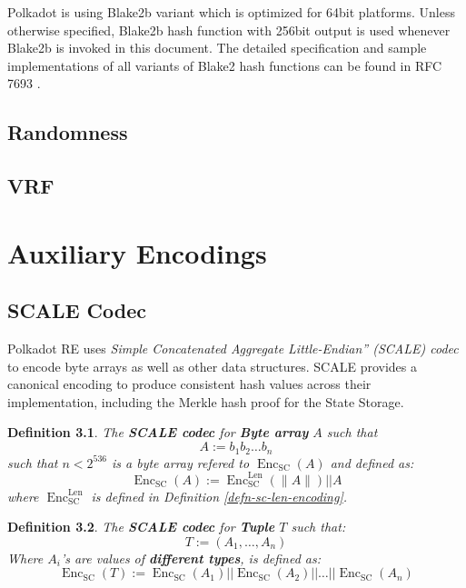 \documentclass{book}
\newcommand{\assign}{:=}
\newcommand{\tmem}[1]{{\em #1\/}}
\newcommand{\tmop}[1]{\ensuremath{\operatorname{#1}}}
\newcommand{\tmstrong}[1]{\textbf{#1}}
\newcommand{\tmtextbf}[1]{{\bfseries{#1}}}
\newcommand{\tmtextit}[1]{{\itshape{#1}}}
\newtheorem{definition}{Definition}
\providecommand{\tmem}[1]{\tmtextit{#1}}
\providecommand{\tmop}[1]{\ensuremath{\mathrm{#1}}}
\providecommand{\tmstrong}[1]{\tmtextbf{#1}}
\providecommand{\tmtextbf}[1]{\tmtextbf{#1}}
\providecommand{\tmtextit}[1]{\tmtextit{#1}}
\newtheorem{definition}{Definition}
\begin{document}
Polkadot is using Blake2b variant which is optimized for 64bit platforms.
Unless otherwise specified, Blake2b hash function with 256bit output is used
whenever Blake2b is invoked in this document. The detailed specification and
sample implementations of all variants of Blake2 hash functions can be found
in RFC 7693 {\cite{saarinen_blake2_2015}}.

\section{Randomness}\label{sect-randomness}

\section{VRF}\label{sect-vrf}

\chapter{Auxiliary Encodings}\label{sect-encoding}

\section{SCALE Codec}\label{sect-scale-codec}

Polkadot RE uses {\tmem{Simple Concatenated Aggregate Little-Endian'' (SCALE)
codec}} to encode byte arrays as well as other data structures. SCALE provides
a canonical encoding to produce consistent hash values across their
implementation, including the Merkle hash proof for the State Storage.

\begin{definition}
  \label{defn-scale-byte-array}The {\tmstrong{SCALE codec}} for
  {\tmstrong{Byte array}} $A$ such that
  \[ A \assign b_1 b_2 \ldots b_n \]
  such that $n < 2^{536}$ is a byte array refered to $\tmop{Enc}_{\tmop{SC}}
  (A)$ and defined as:
  \[ \tmop{Enc}_{\tmop{SC}} (A) \assign \tmop{Enc}^{\tmop{Len}}_{\tmop{SC}}
     (\| A \|) | | A \]
  where $\tmop{Enc}_{\tmop{SC}}^{\tmop{Len}}$ is defined in Definition
  \ref{defn-sc-len-encoding}. 
\end{definition}

\begin{definition}
  \label{defn-scale-tuple}The {\tmstrong{SCALE codec}} for {\tmstrong{Tuple}}
  $T$ such that:
  \[ T \assign (A_1, \ldots, A_n) \]
  Where $A_i$'s are values of {\tmstrong{different types}}, is defined as:
  \[ \tmop{Enc}_{\tmop{SC}} (T) \assign \tmop{Enc}_{\tmop{SC}} (A_1) | |
     \tmop{Enc}_{\tmop{SC}} (A_2) | | \ldots | | \tmop{Enc}_{\tmop{SC}} (A_n)
  \]
\end{definition}
\end{document}
